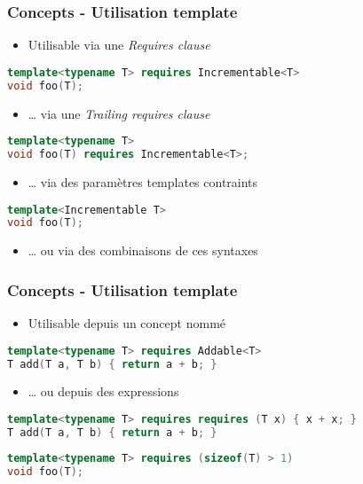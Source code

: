 \documentclass[C++.tex]{subfiles}
\begin{document}
\begin{frame}[fragile]
	\frametitle{Concepts - Utilisation template}
	\begin{itemize}
		\item Utilisable via une \textit{Requires clause}
	\end{itemize}

	\begin{lstlisting}[language=C++]
template<typename T> requires Incrementable<T>
void foo(T);\end{lstlisting}

	\begin{itemize}
		\item \ldots{} via une \textit{Trailing requires clause}
	\end{itemize}

	\begin{lstlisting}[language=C++]
template<typename T>
void foo(T) requires Incrementable<T>;\end{lstlisting}

	\begin{itemize}
		\item \ldots{} via des paramètres templates contraints
	\end{itemize}

	\begin{lstlisting}[language=C++]
template<Incrementable T>
void foo(T);\end{lstlisting}

	\begin{itemize}
		\item \ldots{} ou via des combinaisons de ces syntaxes
	\end{itemize}
\end{frame}

\begin{frame}[fragile]
	\frametitle{Concepts - Utilisation template}
	\begin{itemize}
		\item Utilisable depuis un concept nommé
	\end{itemize}

	\begin{lstlisting}[language=C++]
template<typename T> requires Addable<T>
T add(T a, T b) { return a + b; }\end{lstlisting}

	\begin{itemize}
		\item \ldots{} ou depuis des expressions
	\end{itemize}
 
	\begin{lstlisting}[language=C++]
template<typename T> requires requires (T x) { x + x; }
T add(T a, T b) { return a + b; }\end{lstlisting}

	\begin{lstlisting}[language=C++]
template<typename T> requires (sizeof(T) > 1)
void foo(T);\end{lstlisting}

\end{frame}
\end{document}
